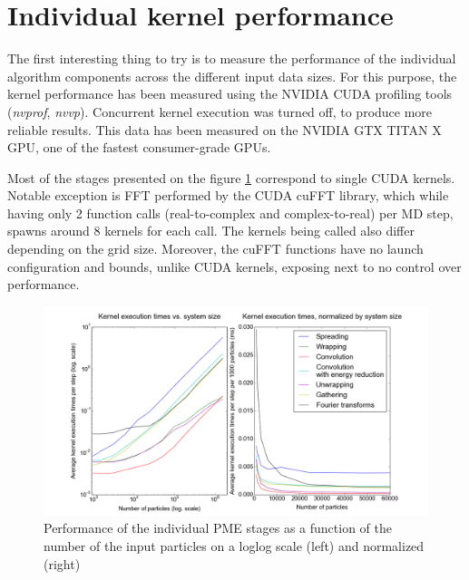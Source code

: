 \documentclass[12pt,a4paper]{report}
\newcommand{\draft}[1]{#1}
\begin{document}


\section{Individual kernel performance} \label{chapter_kernels}

The first interesting thing to try is to measure the performance of the individual algorithm components across the different input data sizes.
For this purpose, the kernel performance has been measured using the NVIDIA CUDA profiling tools (\textit{nvprof}, \textit{nvvp}). Concurrent kernel execution was turned off, to produce more reliable results.
This data has been measured on the NVIDIA GTX TITAN X GPU, one of the fastest consumer-grade GPUs.



Most of the stages presented on the figure \ref{fig:kernels} correspond to single CUDA kernels. Notable exception is FFT performed by the CUDA cuFFT library, which while having only 2 function calls (real-to-complex and complex-to-real) per MD step, spawns around 8 kernels for each call. The kernels being called also differ depending on the grid size. Moreover, the cuFFT functions have no \draft{launch configuration} and \draft{bounds}, unlike CUDA kernels, exposing next to no control over performance. 

\begin{figure} [h!]
    \centering
    \includegraphics[width=1\textwidth]{pics/kernels-noconcur.png}
    \caption{Performance of the individual PME stages as a function of the number of the input particles on a loglog scale (left) and normalized (right)}
    \label{fig:kernels}
\end{figure}
\end{document}
